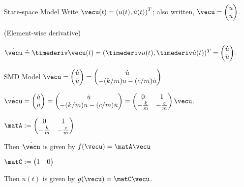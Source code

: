 \documentclass[12pt]{beamer}
\begin{document}
\begin{frame}
\begin{block}{State-space Model}
Write
$\vecu(t) = \left( u(t), \dot u(t) \right)^T$;
also written, 
$\vecu = \begin{pmatrix} u \\ \dot u \end{pmatrix}$.

(Element-wise derivative)

$\dot\vecu
	\doteq \timederiv \vecu(t)
	= ( \timederiv u(t), \timederiv \dot u(t) )^T
	= \begin{pmatrix}
		\dot u \\
		\ddot u
	\end{pmatrix}$.

\end{block}

\begin{block}{SMD Model}
$\dot \vecu
	= \begin{pmatrix} \dot u \\ \ddot u \end{pmatrix}
	= \begin{pmatrix}
		\dot u \\
		-(k/m) u - (c/m) \dot u
		\end{pmatrix}$
		
$\dot \vecu
	= \begin{pmatrix} \dot u \\ \ddot u \end{pmatrix}
	= \begin{pmatrix}
		\dot u \\
		-(k/m) u - (c/m) \dot u
		\end{pmatrix}
	= \begin{pmatrix} 0 & 1 \\ -\frac{k}{m} & -\frac{c}{m} \end{pmatrix}
	\vecu$.
	
\end{block}

\end{frame}


\begin{frame}

\begin{itemize}

\vitem
$\matA := \begin{pmatrix} 0 & 1 \\ -\frac{k}{m} & -\frac{c}{m} \end{pmatrix}$

\vitem
Then $\dot\vecu$ is given by $f(\vecu) = \matA \vecu$

\vitem $\matC := \begin{pmatrix} 1 & 0 \end{pmatrix}$

\vitem
Then $u(t)$ is given by
$g(\vecu) = \matC \vecu$.

\end{itemize}
\vfill\null

\end{frame}
\end{document}
